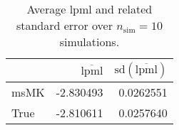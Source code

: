 \begin{table}[H]

\caption{Average lpml and related standard error over $n_{\text{sim}} = 10$ simulations.}
\centering
\begin{tabular}[t]{lrr}
\toprule
  & $\overbar{\text{lpml}}$ & $\text{sd}(\overbar{\text{lpml}})$\\
\midrule
msMK & -2.830493 & 0.0262551\\
True & -2.810611 & 0.0257640\\
\bottomrule
\end{tabular}
\end{table}